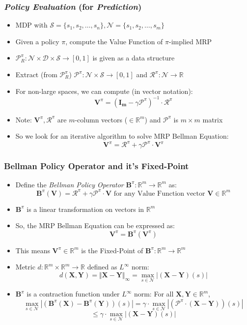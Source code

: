 \documentclass[handout]{beamer}
\newcommand{\bvpi}{\bm{V}^{\pi}}
\newcommand{\bbpi}{\bm{B}^{\pi}}
\newcommand{\bv}{\bm{V}}
\begin{document}
\begin{frame}
\frametitle{{\em Policy Evaluation} (for {\em Prediction})}
\pause
\begin{itemize}[<+->]
\item MDP with $\mathcal{S} = \{s_1, s_2, \ldots, s_n\}, \mathcal{N} = \{s_1, s_2, \ldots, s_m \}$
\item Given a policy $\pi$, compute the Value Function of $\pi$-implied MRP
\item $\mathcal{P}_R^{\pi}: \mathcal{N} \times \mathcal{D} \times \mathcal{S} \rightarrow [0, 1]$ is given as a data structure
\item Extract (from $\mathcal{P}_R^{\pi}$) $\mathcal{P}^{\pi}: \mathcal{N} \times \mathcal{S} \rightarrow [0, 1]$ and  $\mathcal{R}^{\pi}: \mathcal{N} \rightarrow \mathbb{R}$
\item For non-large spaces, we can compute (in vector notation):
$${\bm V}^{\pi} = (\bm{I_m} - \gamma \bm{\mathcal{P}}^{\pi})^{-1} \cdot \bm{\mathcal{R}}^{\pi}$$
\item Note: $\bvpi, \bm{\mathcal{R}}^{\pi}$ are $m$-column vectors ($\in \mathbb{R}^m$) and $\bm{\mathcal{P}}^{\pi}$ is $m \times m$ matrix
\item So we look for an iterative algorithm to solve MRP Bellman Equation:
$$\bvpi  = \bm{\mathcal{R}}^{\pi} + \gamma \bm{\mathcal{P}}^{\pi} \cdot \bvpi$$
\end{itemize}
\end{frame}

\begin{frame}
\frametitle{Bellman Policy Operator and it's Fixed-Point}
\pause
\begin{itemize}[<+->]
\item Define the {\em Bellman Policy Operator} $\bbpi: \mathbb{R}^m \rightarrow \mathbb{R}^m$ as:
$$\bbpi(\bv) = \bm{\mathcal{R}}^{\pi} + \gamma \bm{\mathcal{P}}^{\pi} \cdot \bv \text{ for any Value Function vector } \bv \in \mathbb{R}^m$$
\item $\bbpi$ is a linear transformation on vectors in $\mathbb{R}^m$
\item So, the MRP Bellman Equation can be expressed as:
$$\bvpi = \bbpi(\bvpi)$$
\item This means $\bvpi \in \mathbb{R}^m$ is the Fixed-Point of $\bbpi: \mathbb{R}^m \rightarrow \mathbb{R}^m$
\item Metric $d: \mathbb{R}^m \times \mathbb{R}^m \rightarrow \mathbb{R}$ defined as $L^{\infty}$ norm:
$$d(\bm{X}, \bm{Y}) = \Vert \bm{X} - \bm{Y} \Vert_{\infty} = \max_{s \in \mathcal{N}} |(\bm{X} - \bm{Y})(s)|$$
\item $\bbpi$ is a contraction function under $L^{\infty}$ norm: For all $\bm{X}, \bm{Y} \in \mathbb{R}^m$,
$$\max_{s \in \mathcal{N}} |(\bbpi(\bm{X}) - \bbpi(\bm{Y}))(s)| = \gamma \cdot \max_{s \in \mathcal{N}} |(\bm{\mathcal{P}}^{\pi} \cdot (\bm{X} - \bm{Y}))(s)|$$
$$ \leq \gamma \cdot \max_{s \in \mathcal{N}} |(\bm{X} - \bm{Y})(s)|$$
\end{itemize}
\end{frame}
\end{document}
